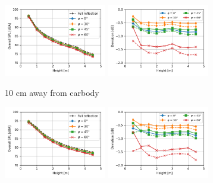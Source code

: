 \begin{figure}[H]
	\centering
	\begin{subfigure}[b]{\textwidth}
		\centering
		\includegraphics[width=0.49\textwidth]{fig/chap5/impedance/overall_SPL/overall_SPL_pos_a.png}
		\includegraphics[width=0.49\textwidth]{fig/chap5/impedance/overall_SPL/deviation_pos_a.png}
		\caption{10 cm away from carbody}
	\end{subfigure}
	\begin{subfigure}[b]{\textwidth}
		\centering
		\includegraphics[width=0.49\textwidth]{fig/chap5/impedance/overall_SPL/overall_SPL_pos_f.png}
		\includegraphics[width=0.49\textwidth]{fig/chap5/impedance/overall_SPL/deviation_pos_f.png}

\end{subfigure}
\end{figure}
